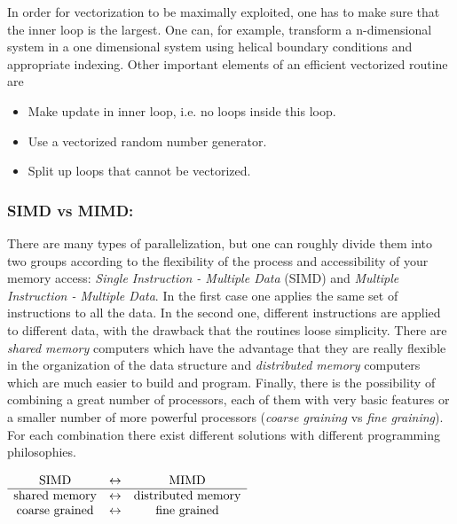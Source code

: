 In order for vectorization to be maximally exploited, one has to make sure that the inner loop is the largest. One can, for example, transform a n-dimensional system in a one dimensional system using helical boundary conditions and appropriate indexing. Other important elements of an efficient vectorized routine are

\begin{itemize}
\item Make update in inner loop, i.e. no loops inside this loop.
\item Use a vectorized random number generator.
\item Split up loops that cannot be vectorized.
\end{itemize}



\subsubsection*{SIMD vs MIMD:}

There are many types of parallelization, but one can roughly divide them into two groups according to the flexibility of the process and accessibility of your memory access: \emph{Single Instruction - Multiple Data} (SIMD) and \emph{Multiple Instruction - Multiple Data}. In the first case one applies the same set of instructions to all the data. In the second one, different instructions are applied to different data, with the drawback that the routines loose simplicity. There are \emph{shared memory} computers which have the advantage that they are really flexible in the organization of the data structure and \emph{distributed memory} computers which are much easier to build and program. Finally, there is the possibility of combining a great number of processors, each of them with very basic features or a smaller number of more powerful processors (\emph{coarse graining} vs \emph{fine graining}). For each combination there exist different solutions with different programming philosophies. 

\vspace{0.3cm}

$
\centering
\begin{array}{ccc}
\text{SIMD}  & \leftrightarrow  & \text{MIMD}\\
 \hline
 \text{shared memory}  & \leftrightarrow   & \text{distributed memory}\\
 \text{coarse grained}  & \leftrightarrow   & \text{fine grained}\\ 
\end{array}
$

